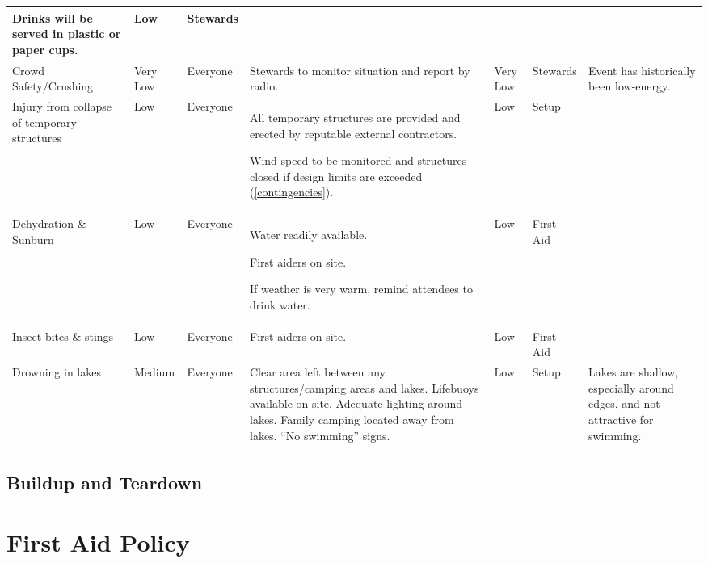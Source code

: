 \begin{landscape}
\begin{table}[h!]
\begin{tabular}{| p{3cm} | l | p{1.5cm} | p{9cm} | p{1.5cm} | p{2cm} | p{6cm} |}
Drinks will be served in plastic or paper cups. &
Low & Stewards & \\ \hline

Crowd Safety/Crushing & Very Low & Everyone &
Stewards to monitor situation and report by radio. &
Very Low & Stewards & Event has historically been low-energy. \\ \hline

Injury from collapse of temporary structures & Low & Everyone &
All temporary structures are provided and erected by reputable external contractors.

Wind speed to be monitored and structures closed if design limits are exceeded (\cref{contingencies}). &
Low & Setup & \\ \hline

Dehydration \& Sunburn & Low & Everyone &
Water readily available.

First aiders on site. 

If weather is very warm, remind attendees to drink water.
& Low & First Aid & \\ \hline

Insect bites \& stings & Low & Everyone &
First aiders on site. & Low & First Aid & \\ \hline

Drowning in lakes & Medium & Everyone &
Clear area left between any structures/camping areas and lakes. 
Lifebuoys available on site. Adequate lighting around lakes.
Family camping located away from lakes. ``No swimming'' signs.
& Low & Setup & 
Lakes are shallow, especially around edges, and not attractive for
swimming.
\\ \hline


\end{tabular}
\end{table}
\newpage
\thispagestyle{empty}
\subsection{Buildup and Teardown}


\end{landscape}
\restoregeometry

\appendix

\section{First Aid Policy}
\label{first-aid-policy}

\newpage

